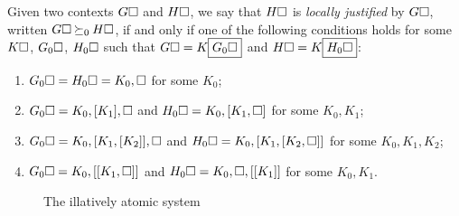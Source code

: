 \begin{scope}
\begin{definition}

  Given two contexts $G\square$ and $H\square$, we say that $H\square$ is
  \emph{locally justified} by $G\square$, written $G\square \mathbin{\succeq_0} H\square$, if and
  only if one of the following conditions holds for some $K\square$, $G_0\square$,
  $H_0\square$ such that $G\square = K\fbox{$G_0\square$}$ and $H\square =
  K\fbox{$H_0\square$}$:
  \begin{enumerate}
    \item $G_0\square = H_0\square = K_0, \square$ for some $K_0$;
    \item $G_0\square = K_0, [K_1], \square$ and $H_0\square = K_0, [K_1, \square]$ for
    some $K_0, K_1$;
    \item $G_0\square = K_0, [K_1, [K_2]], \square$ and $H_0\square = K_0, [K_1, [K_2,
    \square]]$ for some $K_0, K_1, K_2$;
    \item $G_0\square = K_0, [[K_1, \square]]$ and $H_0\square = K_0, \square, [[K_1]]$
    for some $K_0, K_1$.
  \end{enumerate}
\end{definition}

\begin{figure}
  
  \caption{The illatively atomic system }
\end{figure}


\end{scope}
